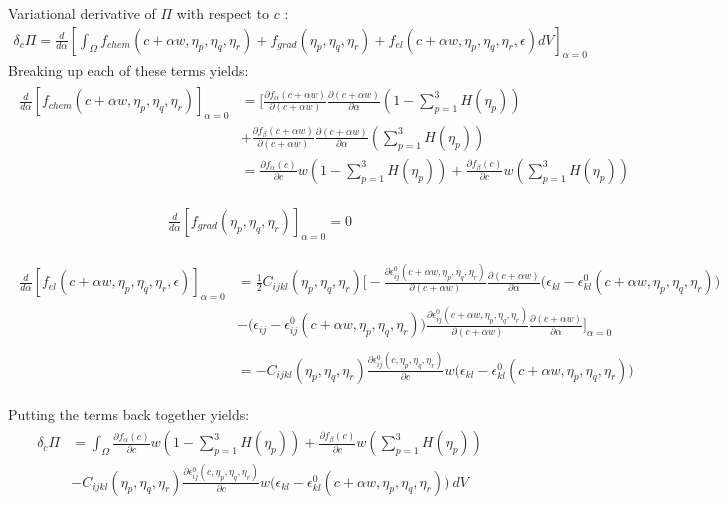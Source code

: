 \documentclass[11pt]{article}
\renewcommand{\=}[1]{\stackrel{#1}{=}} %
\theoremstyle{definition}
\theoremstyle{remark}
\begin{document}
Variational derivative of $\Pi$ with respect to $c$ :
\begin{gather}
\delta_{c} \Pi  =  \frac{d}{d\alpha} \left[\int_{\Omega}  f_{chem}(c+\alpha w,\eta_p,\eta_q,\eta_r) + f_{grad}(\eta_p,\eta_q,\eta_r) + f_{el}(c+\alpha w,\eta_p,\eta_q,\eta_r,\epsilon) dV  \right]_{\alpha=0}
\end{gather}
Breaking up each of these terms yields:
\begin{align}
\begin{split}
\frac{d}{d\alpha} \left[ f_{chem}(c+\alpha w,\eta_p,\eta_q,\eta_r)\right]_{\alpha=0}  &= \bigg[ \frac{\partial f_{\alpha}(c + \alpha w)}{\partial(c+\alpha w)} \frac{\partial(c+\alpha w)}{\partial \alpha} \left(1-\sum_{p=1}^3 H(\eta_p)\right) \\
&+ \frac{\partial f_{\beta}(c+\alpha w)}{\partial(c+\alpha w)} \frac{\partial(c+\alpha w)}{\partial \alpha} \left(\sum_{p=1}^3 H(\eta_p)\right) \\
&= \frac{\partial f_{\alpha}(c)}{\partial c} w \left(1-\sum_{p=1}^3 H(\eta_p)\right) +\frac{\partial f_{\beta}(c)}{\partial c} w \left(\sum_{p=1}^3 H(\eta_p)\right)
\end{split}
\end{align}

\begin{align}
\frac{d}{d\alpha} \left[ f_{grad}(\eta_p,\eta_q,\eta_r)\right]_{\alpha=0} = 0
\end{align}

\begin{align}
\begin{split}
\frac{d}{d\alpha} \left[ f_{el}(c+\alpha w,\eta_p,\eta_q,\eta_r,\epsilon)\right]_{\alpha=0} &= \frac{1}{2} C_{ijkl}(\eta_p,\eta_q,\eta_r)  \bigg[ -\frac{\partial \epsilon_{ij}^0 (c+\alpha w,\eta_p,\eta_q,\eta_r)}{\partial (c + \alpha w)} \frac{\partial(c + \alpha w)}{\partial \alpha} \big(\epsilon_{kl}-\epsilon_{kl}^0 (c+\alpha w,\eta_p,\eta_q,\eta_r)\big)  \\ 
&- \big(\epsilon_{ij}-\epsilon_{ij}^0 (c+\alpha w,\eta_p,\eta_q,\eta_r)\big) \frac{\partial \epsilon_{ij}^0 (c+\alpha w,\eta_p,\eta_q,\eta_r)}{\partial (c + \alpha w)} \frac{\partial(c + \alpha w)}{\partial \alpha} \bigg]_{\alpha=0} \\
\\
&= -C_{ijkl}(\eta_p,\eta_q,\eta_r) \frac{\partial \epsilon_{ij}^0 (c,\eta_p,\eta_q,\eta_r)}{\partial c} w \big(\epsilon_{kl}-\epsilon_{kl}^0 (c+\alpha w,\eta_p,\eta_q,\eta_r)\big)
\end{split}
\end{align}

Putting the terms back together yields:
\begin{gather}
\begin{split}
\delta_{c} \Pi  &=  \int_{\Omega}  \frac{\partial f_{\alpha}(c)}{\partial c} w \left(1-\sum_{p=1}^3 H(\eta_p)\right) +\frac{\partial f_{\beta}(c)}{\partial c} w \left(\sum_{p=1}^3 H(\eta_p)\right) \\
&-C_{ijkl}(\eta_p,\eta_q,\eta_r) \frac{\partial \epsilon_{ij}^0 (c,\eta_p,\eta_q,\eta_r)}{\partial c} w \big(\epsilon_{kl}-\epsilon_{kl}^0 (c+\alpha w,\eta_p,\eta_q,\eta_r)\big) ~dV
\end{split}
\end{gather}
\end{document}
